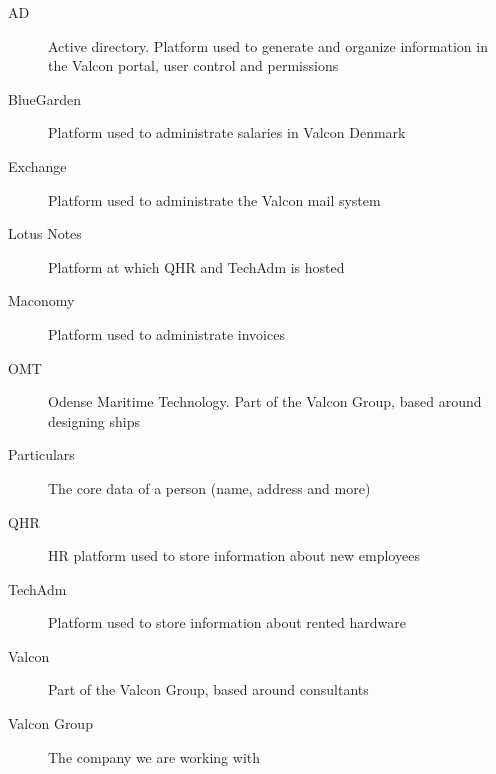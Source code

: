 \begin{description}
\item[AD] Active directory. Platform used to generate and organize information in the Valcon portal, user control and permissions
\item[BlueGarden] Platform used to administrate salaries in Valcon Denmark
\item[Exchange] Platform used to administrate the Valcon mail system
\item[Lotus Notes] Platform at which QHR and TechAdm is hosted
\item[Maconomy] Platform used to administrate invoices
\item[OMT] Odense Maritime Technology. Part of the Valcon Group, based around designing ships
\item[Particulars] The core data of a person (name, address and more)
\item[QHR] HR platform used to store information about new employees
\item[TechAdm] Platform used to store information about rented hardware
\item[Valcon] Part of the Valcon Group, based around consultants
\item[Valcon Group] The company we are working with 
\end{description}

